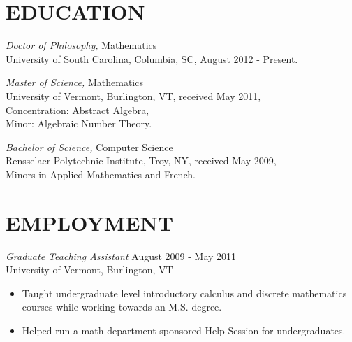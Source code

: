 \documentclass[line,margin]{res}
\begin{document}
\address{103 Elizabeth Darby Lane}
\address{Columbia, SC 29205}

\begin{resume}
  
  
  \section{EDUCATION} 
          {\sl Doctor of Philosophy,} Mathematics\\
          University of South Carolina, Columbia, SC, 
          August 2012 - Present.
          
          {\sl Master of Science,} Mathematics\\
          University of Vermont, Burlington, VT, 
          received May 2011,\\
          Concentration: Abstract Algebra,\\
          Minor: Algebraic Number Theory.

          {\sl Bachelor of Science,} Computer Science \\
          Rensselaer Polytechnic Institute, Troy, NY, 
          received May 2009,\\
          Minors in Applied Mathematics and French.\\

          \section{EMPLOYMENT} 
                  {\sl Graduate Teaching Assistant} \hfill August 2009 - May 2011 \\
                  University of Vermont, Burlington, VT\\
                  \begin{itemize}  \itemsep -2pt %
                  \item
                    Taught undergraduate level introductory calculus and discrete mathematics courses while working towards an M.S. degree.
                  \item 
                    Helped run a math department sponsored Help Session for undergraduates.
                  \end{itemize}


\end{resume}
\end{document}
